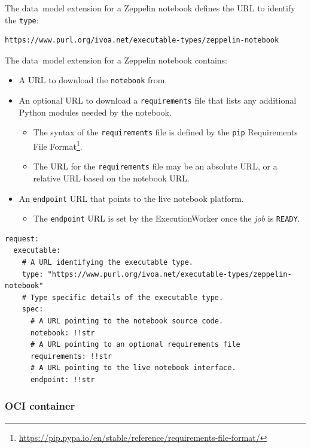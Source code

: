 \documentclass[11pt,a4paper]{ivoa}
\newcommand{\datamodel} {data~model}
\newcommand{\execworker} {ExecutionWorker}
\newcommand{\python} {Python}
\newcommand{\zeppelin} {Zeppelin}
\newcommand{\codeword}[1] {\texttt{#1}}
\newcommand{\footurl}[1] {\footnote{\url{#1}}}
\newcommand{\job} {\textit{job}}
\begin{document}
The \datamodel{} extension for a \zeppelin{} notebook defines the URL
to identify the \codeword{type}:
\begin{lstlisting}[]
https://www.purl.org/ivoa.net/executable-types/zeppelin-notebook
\end{lstlisting}
\hfill \break
The \datamodel{} extension for a \zeppelin{} notebook contains:
\begin{itemize}
    \item A URL to download the \codeword{notebook} from.
    \item An optional URL to download a \codeword{requirements} file that lists any additional
    \python{} modules needed by the notebook.
    \begin{itemize}
        \item The syntax of the \codeword{requirements} file is defined by the \codeword{pip}
        Requirements File Format\footurl{https://pip.pypa.io/en/stable/reference/requirements-file-format/}.
        \item The URL for the \codeword{requirements} file may be an absolute URL, or a relative URL based on the notebook URL.
    \end{itemize}
    \item An \codeword{endpoint} URL that points to the live notebook platform.
    \begin{itemize}
        \item The \codeword{endpoint} URL is set by the \execworker{} once the \job{} is \codeword{READY}.
    \end{itemize}
\end{itemize}

\begin{lstlisting}[]
request:
  executable:
    # A URL identifying the executable type.
    type: "https://www.purl.org/ivoa.net/executable-types/zeppelin-notebook"
    # Type specific details of the executable type.
    spec:
      # A URL pointing to the notebook source code.
      notebook: !!str
      # A URL pointing to an optional requirements file
      requirements: !!str
      # A URL pointing to the live notebook interface.
      endpoint: !!str
\end{lstlisting}

\subsubsection{OCI container}
\label{datamodel-oci-container}
\end{document}
